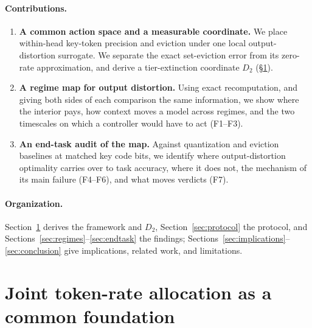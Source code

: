 \documentclass{article}
\theoremstyle{definition}
\begin{document}
\paragraph{Contributions.}
\begin{enumerate}[leftmargin=*,itemsep=1pt,topsep=2pt]
  \item \textbf{A common action space and a measurable coordinate.} We place within-head key-token precision and eviction under one local output-distortion surrogate.  We separate the exact set-eviction error from its zero-rate approximation, and derive a tier-extinction coordinate $D_2$ (\S\ref{sec:framework}).
  \item \textbf{A regime map for output distortion.} Using exact recomputation, and giving both sides of each comparison the same information, we show where the interior pays, how context moves a model across regimes, and the two timescales on which a controller would have to act (F1--F3).
  \item \textbf{An end-task audit of the map.} Against quantization and eviction baselines at matched key code bits, we identify where output-distortion optimality carries over to task accuracy, where it does not, the mechanism of its main failure (F4--F6), and what moves verdicts (F7).
\end{enumerate}


\paragraph{Organization.}  Section~\ref{sec:framework} derives the framework and $D_2$, Section~\ref{sec:protocol} the protocol, and Sections~\ref{sec:regimes}--\ref{sec:endtask} the findings; Sections~\ref{sec:implications}--\ref{sec:conclusion} give implications, related work, and limitations.

\section{Joint token-rate allocation as a common foundation}
\label{sec:framework}
\end{document}

